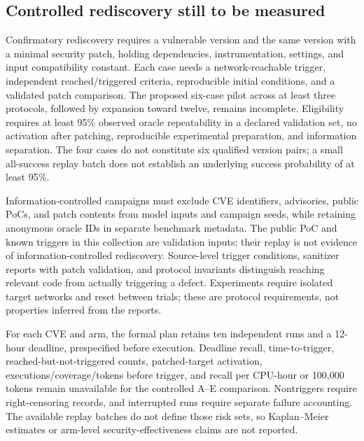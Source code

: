 \subsection{Controlled rediscovery still to be measured}
Confirmatory rediscovery requires a vulnerable version and the same version with a minimal security patch, holding dependencies, instrumentation, settings, and input compatibility constant. Each case needs a network-reachable trigger, independent reached/triggered criteria, reproducible initial conditions, and a validated patch comparison. The proposed six-case pilot across at least three protocols, followed by expansion toward twelve, remains incomplete. Eligibility requires at least 95\% observed oracle repeatability in a declared validation set, no activation after patching, reproducible experimental preparation, and information separation. The four cases do not constitute six qualified version pairs; a small all-success replay batch does not establish an underlying success probability of at least 95\%.

Information-controlled campaigns must exclude CVE identifiers, advisories, public PoCs, and patch contents from model inputs and campaign seeds, while retaining anonymous oracle IDs in separate benchmark metadata. The public PoC and known triggers in this collection are validation inputs; their replay is not evidence of information-controlled rediscovery. Source-level trigger conditions, sanitizer reports with patch validation, and protocol invariants distinguish reaching relevant code from actually triggering a defect. Experiments require isolated target networks and reset between trials; these are protocol requirements, not properties inferred from the reports.

For each CVE and arm, the formal plan retains ten independent runs and a 12-hour deadline, prespecified before execution. Deadline recall, time-to-trigger, reached-but-not-triggered counts, patched-target activation, executions/coverage/tokens before trigger, and recall per CPU-hour or 100,000 tokens remain unavailable for the controlled A--E comparison. Nontriggers require right-censoring records, and interrupted runs require separate failure accounting. The available replay batches do not define those risk sets, so Kaplan--Meier estimates or arm-level security-effectiveness claims are not reported.
